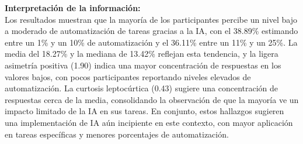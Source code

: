 \noindent\textbf{Interpretación de la información:} \\
Los resultados muestran que la mayoría de los participantes percibe un nivel bajo a moderado de automatización de tareas gracias a la IA, con el 38.89\% estimando entre un 1\% y un 10\% de automatización y el 36.11\% entre un 11\% y un 25\%. La media del 18.27\% y la mediana de 13.42\% reflejan esta tendencia, y la ligera asimetría positiva (1.90) indica una mayor concentración de respuestas en los valores bajos, con pocos participantes reportando niveles elevados de automatización. La curtosis leptocúrtica (0.43) sugiere una concentración de respuestas cerca de la media, consolidando la observación de que la mayoría ve un impacto limitado de la IA en sus tareas. En conjunto, estos hallazgos sugieren una implementación de IA aún incipiente en este contexto, con mayor aplicación en tareas específicas y menores porcentajes de automatización.